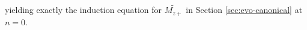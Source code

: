 %
yielding exactly the induction equation for $\widetilde{M_{z+}}$ in Section \ref{sec:evo-canonical} at $n=0$.

